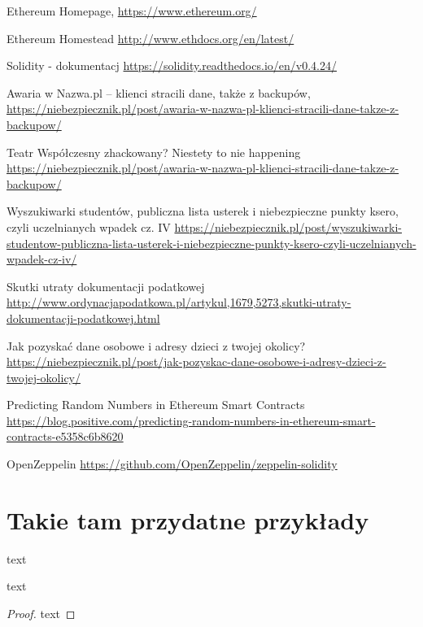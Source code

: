 \documentclass[]{llncs}
\begin{document}
%
%
%
% 
% 
%
\begin{thebibliography}{splncs04}
   Ethereum Homepage,
  \url{https://www.ethereum.org/}

   Ethereum Homestead
  \url{http://www.ethdocs.org/en/latest/}


   Solidity - dokumentacj
  \url{https://solidity.readthedocs.io/en/v0.4.24/}

   Awaria w Nazwa.pl – klienci stracili dane, także z backupów,
  \url{https://niebezpiecznik.pl/post/awaria-w-nazwa-pl-klienci-stracili-dane-takze-z-backupow/}

   Teatr Współczesny zhackowany? Niestety to nie happening
  \url{https://niebezpiecznik.pl/post/awaria-w-nazwa-pl-klienci-stracili-dane-takze-z-backupow/}

   Wyszukiwarki studentów, publiczna lista usterek i niebezpieczne punkty ksero, czyli uczelnianych wpadek cz. IV
  \url{https://niebezpiecznik.pl/post/wyszukiwarki-studentow-publiczna-lista-usterek-i-niebezpieczne-punkty-ksero-czyli-uczelnianych-wpadek-cz-iv/}

   Skutki utraty dokumentacji podatkowej
  \url{http://www.ordynacjapodatkowa.pl/artykul,1679,5273,skutki-utraty-dokumentacji-podatkowej.html}

   Jak pozyskać dane osobowe i adresy dzieci z twojej okolicy?
  \url{https://niebezpiecznik.pl/post/jak-pozyskac-dane-osobowe-i-adresy-dzieci-z-twojej-okolicy/}

   Predicting Random Numbers in Ethereum Smart Contracts
  \url{https://blog.positive.com/predicting-random-numbers-in-ethereum-smart-contracts-e5358c6b8620}

   OpenZeppelin
  \url{https://github.com/OpenZeppelin/zeppelin-solidity}

\end{thebibliography}



\newpage
\newpage

\section{Takie tam przydatne przykłady}
\begin{definition} text \end{definition}
\begin{case} text \end{case}
\begin{proof} text \end{proof}
\end{document}
